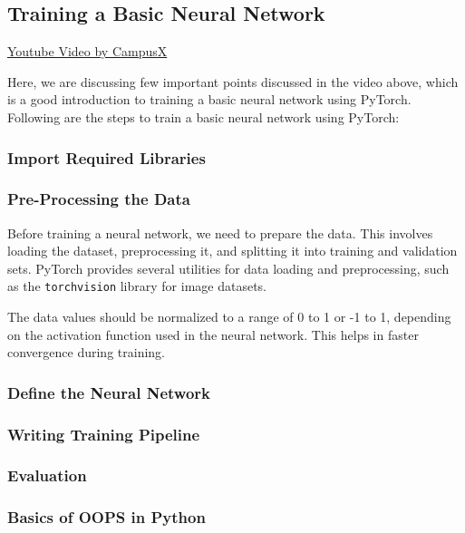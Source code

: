 \documentclass[12pt, a4paper]{article}
\begin{document}
\subsection{Training a Basic Neural Network}
\href{https://youtu.be/MKxEbbKpL5Q?si=rq2xCbflcuIfhI3e}{Youtube Video by CampusX}

Here, we are discussing few important points discussed in the video above, which is a good introduction to training a basic neural network using PyTorch.
Following are the steps to train a basic neural network using PyTorch:

\subsubsection{Import Required Libraries}

\subsubsection{Pre-Processing the Data}

Before training a neural network, we need to prepare the data. This involves loading the dataset, preprocessing it, and splitting it into training and validation sets. PyTorch provides several utilities for data loading and preprocessing, such as the \texttt{torchvision} library for image datasets.

\vspace{0.5em}

The data values should be normalized to a range of 0 to 1 or -1 to 1, depending on the activation function used in the neural network. This helps in faster convergence during training.


\subsubsection{Define the Neural Network}

\subsubsection{Writing Training Pipeline}

\subsubsection{Evaluation}

\subsubsection{Basics of OOPS in Python}
\end{document}
